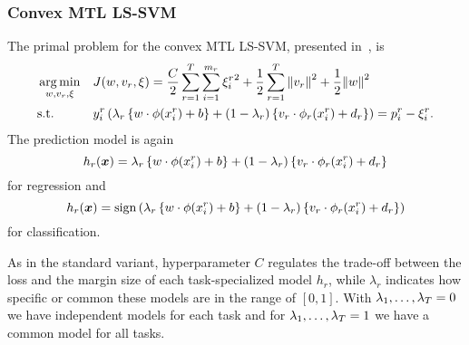 \subsubsection{{Convex} MTL LS-SVM}
The primal problem for the convex MTL LS-SVM, presented in~\cite{RuizAD21}, is
\begin{equation}\label{eq:svmmtl_primal_convex_ls}
    \begin{aligned}
    & \argmin_{w, {v}_r, \xi}
    & & {J({w}, {v}_r, \xi) = \frac{C}{2} \sum_{r= 1}^T \sum_{i=1}^{m_r} {\xi_{i}^r}^2 + \frac{1}{2} \sum_{r= 1}^T{\norm{{v}_r}^2} + \frac{1}{2} {\norm{{w}}}^2} \\
    & \text{s.t.}
    & & y_{i}^r \left(\lambda_r \left\lbrace {w} \cdot \phi(x_{i}^r) + b  \right\rbrace + (1 - \lambda_r) \left\lbrace {v}_r \cdot \phi_r(x_{i}^r) + d_r \right\rbrace  \right) = p_{i}^r - \xi_{i}^r .  \\
    \end{aligned}
\end{equation}
The prediction model is again
\begin{equation}
    \nonumber
    h_r(\bm{x}) = \lambda_r \left\lbrace {w} \cdot \phi(x_{i}^r) + b  \right\rbrace + (1 - \lambda_r) \left\lbrace {v}_r \cdot \phi_r(x_{i}^r) + d_r \right\rbrace
\end{equation}
for regression and 
\begin{equation}
    \nonumber
    h_r(\bm{x}) = \operatorname{sign}{ \left(\lambda_r \left\lbrace {w} \cdot \phi(x_{i}^r) + b  \right\rbrace + (1 - \lambda_r) \left\lbrace {v}_r \cdot \phi_r(x_{i}^r) + d_r \right\rbrace \right)}
\end{equation}
for classification.
%

As in the standard variant, hyperparameter $C$ regulates the trade-off between the loss and the margin size of each task-specialized model $h_r$, while $\lambda_r$ indicates how specific or common these models are in the range of $[0, 1]$. With $\lambda_1, \ldots, \lambda_T=0$ we have independent models for each task and for $\lambda_1, \ldots, \lambda_T=1$ we have a common model for all tasks. 
 



